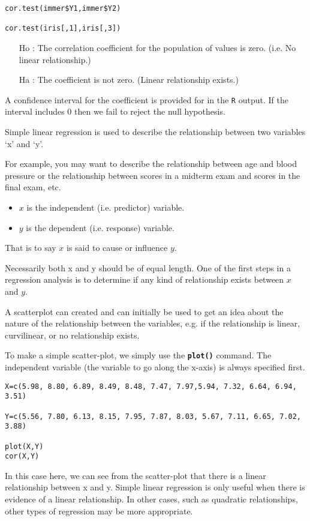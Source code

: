 \begin{framed}
\begin{verbatim}
cor.test(immer$Y1,immer$Y2)

cor.test(iris[,1],iris[,3])
\end{verbatim}
\end{framed}

\begin{itemize}
\item[Ho] : The correlation coefficient for the population of values is zero. (i.e. No linear relationship.)
\item[Ha]: The coefficient is not zero. (Linear relationship exists.)
\end{itemize}	


A confidence interval for the coefficient is provided for in the \texttt{R} output. If the interval includes 0 then we fail to reject the null hypothesis.

Simple linear regression is used to describe the relationship between two variables ‘x’ and ‘y’.

For example, you may want to describe the relationship between age and blood pressure or the relationship between scores in a midterm exam and scores in the final exam, etc.

\begin{itemize}
\item	$x$ is the independent (i.e. predictor) variable.
\item	$y$ is the dependent (i.e. response) variable.
\end{itemize}
That is to say $x$ is said to cause or influence $y$.

Necessarily both x and y should be of equal length. One of the first steps in a regression analysis is to determine if any kind of relationship exists between $x$ and $y$.

A scatterplot can created and can initially be used to get an idea about the nature of the relationship between the variables, e.g. if the relationship is linear, curvilinear, or no relationship exists.

To make a simple scatter-plot, we simply use the \texttt{\textbf{plot()}} command. The independent variable (the variable to go along the x-axis) is always specified first.



\begin{framed}
\begin{verbatim}
X=c(5.98, 8.80, 6.89, 8.49, 8.48, 7.47, 7.97,5.94, 7.32, 6.64, 6.94, 3.51)

Y=c(5.56, 7.80, 6.13, 8.15, 7.95, 7.87, 8.03, 5.67, 7.11, 6.65, 7.02, 3.88)

plot(X,Y)
cor(X,Y)
\end{verbatim}
\end{framed}
In this case here, we can see from the scatter-plot that there is a linear relationship between x and y.
Simple linear regression is only useful when there is evidence of a linear relationship. In other cases, such as quadratic relationships, other types of regression may be more appropriate.

